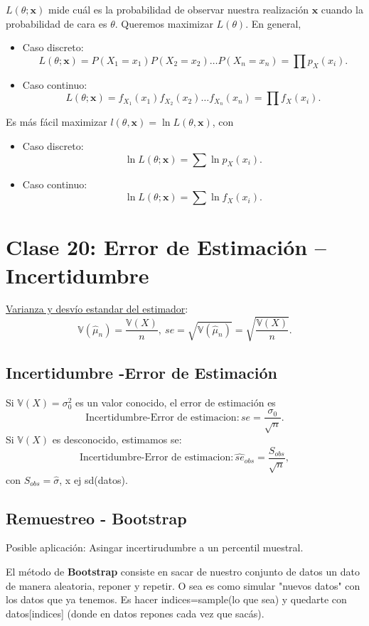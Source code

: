 \documentclass[a4paper,12pt]{article}
\theoremstyle{definition}
\numberwithin{prop}{section}
\theoremstyle{remark}
\numberwithin{ej_subseccion}{subsection}
\begin{document}
	$L(\theta; \mathbf{x})$ mide cuál es la probabilidad de observar nuestra realización $\mathbf{x}$ cuando la probabilidad de cara es $\theta$. Queremos maximizar $L(\theta)$. En general,
	\begin{itemize}
		\item Caso discreto: 
		$$L(\theta; \mathbf{x})=P(X_1=x_1)P(X_2=x_2)\dots P(X_n=x_n) =\prod p_X(x_i).$$
		\item Caso continuo: 
		$$L(\theta; \mathbf{x})=f_{X_1}(x_1)f_{X_2}(x_2)\dots f_{X_n}(x_n)=\prod f_X(x_i).$$
	\end{itemize}
	Es más fácil maximizar $l(\theta,\mathbf{x})=\ln L(\theta,\mathbf{x})$, con
	\begin{itemize}
		\item Caso discreto: 
		$$\ln L(\theta; \mathbf{x})=\sum \ln p_X(x_i).$$
		\item Caso continuo: 
		$$\ln L(\theta; \mathbf{x})=\sum \ln f_{X}(x_i).$$
	\end{itemize}

	\section*{Clase 20: Error de Estimación – Incertidumbre}
	
	\underline{Varianza y desvío estandar del estimador}:
	$$\mathbb{V}(\hat{\mu}_n)=\frac{\mathbb{V}(X)}{n},\ se=\sqrt{\mathbb{V}(\hat{\mu}_n)}=\sqrt{\frac{\mathbb{V}(X)}{n}}.$$
	
	\subsection*{Incertidumbre -Error de Estimación}
	
	Si $\mathbb{V}(X)=\sigma_0^2$ es un valor conocido, el error de estimación es
	$$\text{Incertidumbre-Error de estimacion}: se=\frac{\sigma_0}{\sqrt{n}}.$$
	Si $\mathbb{V}(X)$ es desconocido, estimamos se:
	$$\text{Incertidumbre-Error de estimacion}: \hat{se}_{obs}=\frac{S_{obs}}{\sqrt{n}},$$
	con $S_{obs}=\hat{\sigma}$, x ej sd(datos).
	
	\subsection*{Remuestreo - Bootstrap}
	Posible aplicación: Asingar incertirudumbre a un percentil
	muestral.
	
	El método de \textbf{Bootstrap} consiste en sacar de nuestro conjunto de datos un dato de manera aleatoria, reponer y repetir. O sea es como simular "nuevos datos" con los datos que ya tenemos. Es hacer indices=sample(lo que sea) y quedarte con datos[indices] (donde en datos repones cada vez que sacás).
	
\end{document}
